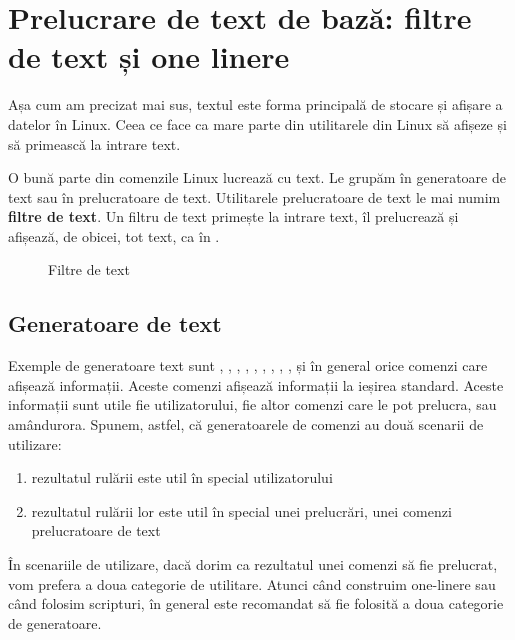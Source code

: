 \section{Prelucrare de text de bază: filtre de text și one linere}
\label{sec:cli:basic-proc}

Așa cum am precizat mai sus, textul este forma principală de stocare și afișare a datelor în Linux.
Ceea ce face ca mare parte din utilitarele din Linux să afișeze și să primească la intrare text.

O bună parte din comenzile Linux lucrează cu text.
Le grupăm în generatoare de text sau în prelucratoare de text.
Utilitarele prelucratoare de text le mai numim \textbf{filtre de text}.
Un filtru de text primește la intrare text, îl prelucrează și afișează, de obicei, tot text, ca în .

\begin{figure}[htbp]
  \centering
  \def\svgwidth{0.8\columnwidth}
  
  \caption{Filtre de text}
  \label{fig:cli:text-filters}
\end{figure}

\subsection{Generatoare de text}
\label{sec:cli:basic-proc:gen}

Exemple de generatoare text sunt , , , , , , , , ,  și în general orice comenzi care afișează informații.
Aceste comenzi afișează informații la ieșirea standard.
Aceste informații sunt utile fie utilizatorului, fie altor comenzi care le pot prelucra, sau amândurora.
Spunem, astfel, că generatoarele de comenzi au două scenarii de utilizare:

\begin{enumerate}
  \item rezultatul rulării este util în special utilizatorului
  \item rezultatul rulării lor este util în special unei prelucrări, unei comenzi prelucratoare de text
\end{enumerate}

În scenariile de utilizare, dacă dorim ca rezultatul unei comenzi să fie prelucrat, vom prefera a doua categorie de utilitare.
Atunci când construim one-linere sau când folosim scripturi, în general este recomandat să fie folosită a doua categorie de generatoare.

